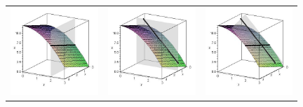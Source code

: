 \renewcommand{\mywidth}{1.3in}
\begin{center}
\begin{tabular}{ccc}
\includegraphics[width=\mywidth]{04-Derivatives/support/tan-1}&
\includegraphics[width=\mywidth]{04-Derivatives/support/tan-2}&
\includegraphics[width=\mywidth]{04-Derivatives/support/tan-3}

\end{tabular}
\end{center}
